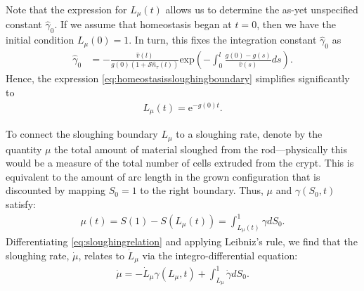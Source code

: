Note that the expression for $L_\mu(t)$ allows us to determine the as-yet unspecified constant $\hat{\gamma}_0$. If we assume that homeostasis began at $t = 0$, then we have the initial condition $L_\mu(0) = 1$. In turn, this fixes the integration constant $\hat{\gamma}_0$ as
\begin{align}
\hat{\gamma}_0 &= -\frac{\hat{v}(l)}{g(0)(1 + \mathcal{S}\hat{n}_\tau(l))}\mathrm{exp}\left(-\int^l_0\frac{g(0) - g(s)}{\hat{v}(s)}ds\right).\label{eq:gamma0constant}
\end{align}
Hence, the expression \eqref{eq:homeostasissloughingboundary} simplifies significantly to
\begin{align}
L_\mu(t) =\mathrm{e}^{-g(0)t}.\label{eq:homeostasissloughingboundarysimplified}
\end{align}

To connect the sloughing boundary $L_\mu$ to a sloughing rate, denote by the quantity $\mu$ the total amount of material sloughed from the rod---physically this would be a measure of the total number of cells extruded from the crypt. This is equivalent to the amount of arc length in the grown configuration that is discounted by mapping $S_0=1$ to the right boundary. Thus, $\mu$ and $\gamma(S_0, t)$ satisfy:
\begin{align}
\mu(t) = S(1) - S(L_\mu(t)) = \int^1_{L_\mu(t)}\gamma dS_0.\label{eq:sloughingrelation}
\end{align}
Differentiating \eqref{eq:sloughingrelation} and applying Leibniz's rule, we find that the sloughing rate, $\dot{\mu}$, relates to $\dot{L}_\mu$ via the integro-differential equation:
\begin{align}
\dot{\mu}  = -\dot{L}_\mu\gamma(L_\mu, t) +\int^{1}_{L_\mu}\dot{\gamma} dS_0.\label{eq:sloughrateeqnhalfinterval}
\end{align} 

